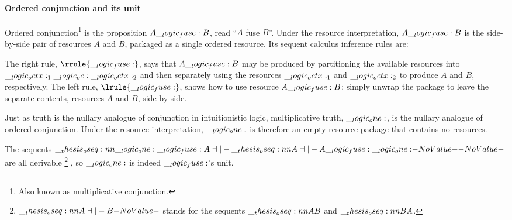 \paragraph*{Ordered conjunction and its unit}\label{p:ordered-logic:ordered-conjunction}
Ordered conjunction\footnote{Also known as multiplicative conjunction.} is the proposition $A \__logic_fuse: B$, read \enquote{$A$ fuse $B$}.
Under the resource interpretation, $A \__logic_fuse: B$ is the side-by-side pair of resources $A$ and $B$, packaged as a single ordered resource.
Its sequent calculus inference rules are:
The right rule, $\rrule{\fuse}$, says that $A \__logic_fuse: B$ may be produced by partitioning the available resources into $\__logic_octx:_1 \__logic_oc: \__logic_octx:_2$ and then separately using the resources $\__logic_octx:_1$ and $\__logic_octx:_2$ to produce $A$ and $B$, respectively.
The left rule, $\lrule{\fuse}$, shows how to use resource $A \__logic_fuse: B$: simply unwrap the package to leave the separate contents, resources $A$ and $B$, side by side.

Just as truth is the nullary analogue of conjunction in intuitionistic logic, multiplicative truth, $\__logic_one:$, is the nullary analogue of ordered conjunction.
Under the resource interpretation, $\__logic_one:$ is therefore an empty resource package that contains no resources.
The sequents $\oseq{\one \fuse A \dashv|- \oseq{A \dashv|- A \fuse \one}}$ are all derivable%
\footnote{$\oseq{A \dashv|- B}$ stands for the sequents $\oseq{A |- B}$ and $\oseq{B |- A}$.}%
, so $\__logic_one:$ is indeed $\__logic_fuse:$'s unit.%

